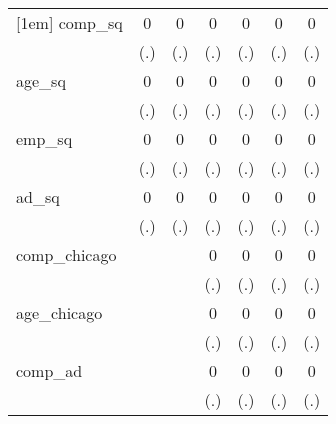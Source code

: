 {\begin{tabular}{l*{6}{c}}
[1em]
comp\_sq     &           0         &           0         &           0         &           0         &           0         &           0         \\
            &         (.)         &         (.)         &         (.)         &         (.)         &         (.)         &         (.)         \\
[1em]
age\_sq      &           0         &           0         &           0         &           0         &           0         &           0         \\
            &         (.)         &         (.)         &         (.)         &         (.)         &         (.)         &         (.)         \\
[1em]
emp\_sq      &           0         &           0         &           0         &           0         &           0         &           0         \\
            &         (.)         &         (.)         &         (.)         &         (.)         &         (.)         &         (.)         \\
[1em]
ad\_sq       &           0         &           0         &           0         &           0         &           0         &           0         \\
            &         (.)         &         (.)         &         (.)         &         (.)         &         (.)         &         (.)         \\
[1em]
comp\_chicago&                     &                     &           0         &           0         &           0         &           0         \\
            &                     &                     &         (.)         &         (.)         &         (.)         &         (.)         \\
[1em]
age\_chicago &                     &                     &           0         &           0         &           0         &           0         \\
            &                     &                     &         (.)         &         (.)         &         (.)         &         (.)         \\
[1em]
comp\_ad     &                     &                     &           0         &           0         &           0         &           0         \\
            &                     &                     &         (.)         &         (.)         &         (.)         &         (.)         \\

\end{tabular}}
